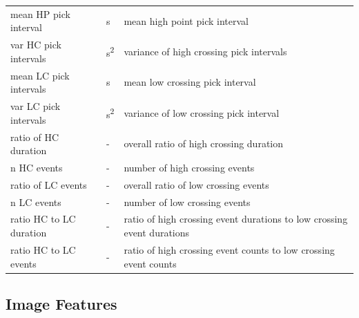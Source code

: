 \documentclass[10pt]{article}
\begin{document}
\begin{table}[h]
\begin{tabular}{lll}
    mean HP pick interval & \si{s} &  mean high point pick interval \\
    \addlinespace[2pt]
    var HC pick intervals & \si{s^2} &  variance of high crossing pick intervals \\
    \addlinespace[2pt]
    mean LC pick intervals & \si{s} &  mean low crossing pick interval \\
    \addlinespace[2pt]
    var LC pick intervals & \si{s^2} &  variance of low crossing pick interval \\
    \addlinespace[2pt]
    ratio of HC duration & - & overall ratio of high crossing duration \\
    \addlinespace[2pt]
    n HC events & - &  number of high crossing events \\
    \addlinespace[2pt]
    ratio of LC events & - &  overall ratio of low crossing events \\
    \addlinespace[2pt]
    n LC events & - &  number of low crossing events \\
    \addlinespace[2pt]
    ratio HC to LC duration & - &  ratio of high crossing event durations to low crossing event durations \\
    \addlinespace[2pt]
    ratio HC to LC events & - &  ratio of high crossing event counts to low crossing event counts \\

    \bottomrule
  \end{tabular}
\end{table}

\subsection{Image Features}
\end{document}
